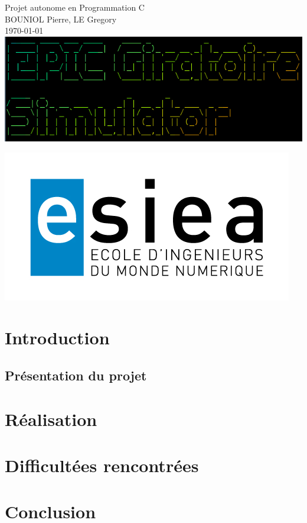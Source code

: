 \documentclass[a4paper,12pt]{report}
\begin{document}
\begin{titlepage}
\begin{center}
{\Huge Projet autonome en Programmation C}\\[4ex] 
{\Large  \textsc{BOUNIOL} Pierre, \textsc{LE} Gregory}\\[4ex] 
\today\\[8ex]
\includegraphics[scale=0.6]{logo2.png}\\[59ex]
\end{center}
\raggedleft
\includegraphics[scale=0.2]{Logo-ESIEA.jpg}
\end{titlepage}

\renewcommand{\contentsname}{Sommaire}

\tableofcontents

\part{Introduction}
\chapter{Présentation du projet}
\part{Réalisation}
\part{Difficultées rencontrées}
\part{Conclusion}
\end{document}
